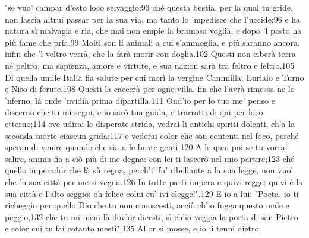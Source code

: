 \documentclass[12pt,a4paper]{article}
\begin{document}
"se vuo’ campar d’esto loco selvaggio;93
ché questa bestia, per la qual tu gride,
non lascia altrui passar per la sua via,
ma tanto lo ’mpedisce che l’uccide;96
e ha natura sì malvagia e ria,
che mai non empie la bramosa voglia,
e dopo ’l pasto ha più fame che pria.99
Molti son li animali a cui s’ammoglia,
e più saranno ancora, infin che ’l veltro
verrà, che la farà morir con doglia.102
Questi non ciberà terra né peltro,
ma sapïenza, amore e virtute,
e sua nazion sarà tra feltro e feltro.105
Di quella umile Italia fia salute
per cui morì la vergine Cammilla,
Eurialo e Turno e Niso di ferute.108
Questi la caccerà per ogne villa,
fin che l’avrà rimessa ne lo ’nferno,
là onde ’nvidia prima dipartilla.111
Ond’io per lo tuo me’ penso e discerno
che tu mi segui, e io sarò tua guida,
e trarrotti di qui per loco etterno;114
ove udirai le disperate strida,
vedrai li antichi spiriti dolenti,
ch’a la seconda morte ciascun grida;117
e vederai color che son contenti
nel foco, perché speran di venire
quando che sia a le beate genti.120
A le quai poi se tu vorrai salire,
anima fia a ciò più di me degna:
con lei ti lascerò nel mio partire;123
ché quello imperador che là sù regna,
perch’i’ fu’ ribellante a la sua legge,
non vuol che ’n sua città per me si vegna.126
In tutte parti impera e quivi regge;
quivi è la sua città e l’alto seggio:
oh felice colui cu’ ivi elegge!".129
E io a lui: "Poeta, io ti richeggio
per quello Dio che tu non conoscesti,
acciò ch’io fugga questo male e peggio,132
che tu mi meni là dov’or dicesti,
sì ch’io veggia la porta di san Pietro
e color cui tu fai cotanto mesti".135
Allor si mosse, e io li tenni dietro.
\end{document}
